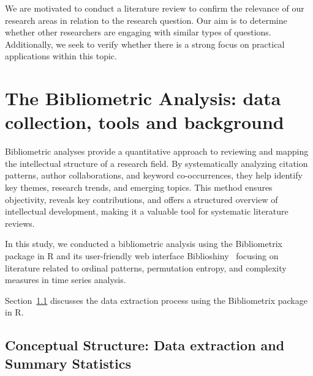 We are motivated to conduct a literature review to confirm the relevance of our research areas in relation to the research question. Our aim is to determine whether other researchers are engaging with similar types of questions. Additionally, we seek to verify whether there is a strong focus on practical applications within this topic. 


\section{The Bibliometric Analysis: data collection, tools and background}\label{Sec:BiblioIntro}

Bibliometric analyses provide a quantitative approach to reviewing and mapping the intellectual structure of a research field. By systematically analyzing citation patterns, author collaborations, and keyword co-occurrences, they help identify key themes, research trends, and emerging topics. This method ensures objectivity, reveals key contributions, and offers a structured overview of intellectual development, making it a valuable tool for systematic literature reviews.

In this study, we conducted a bibliometric analysis using the Bibliometrix package in R and its user-friendly web interface Biblioshiny~\cite{Aria2017} focusing on literature related to ordinal patterns, permutation entropy, and complexity measures in time series analysis. 

Section~\ref{Subsec:Dataextraction} discusses the data extraction process using the Bibliometrix package in R.

\subsection{Conceptual Structure: Data extraction and Summary Statistics}\label{Subsec:Dataextraction}

